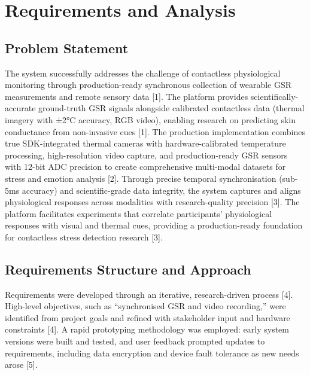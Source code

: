 
\chapter{Requirements and Analysis}
\label{ch:requirements}


\section{Problem Statement}

The system successfully addresses the challenge of contactless physiological monitoring through production-ready synchronous collection of wearable GSR measurements and remote sensory data [1]. The platform provides scientifically-accurate ground-truth GSR signals alongside calibrated contactless data (thermal imagery with ±2°C accuracy, RGB video), enabling research on predicting skin conductance from non-invasive cues [1]. The production implementation combines true SDK-integrated thermal cameras with hardware-calibrated temperature processing, high-resolution video capture, and production-ready GSR sensors with 12-bit ADC precision to create comprehensive multi-modal datasets for stress and emotion analysis [2]. Through precise temporal synchronisation (sub-5ms accuracy) and scientific-grade data integrity, the system captures and aligns physiological responses across modalities with research-quality precision [3]. The platform facilitates experiments that correlate participants' physiological responses with visual and thermal cues, providing a production-ready foundation for contactless stress detection research [3].


\section{Requirements Structure and Approach}

Requirements were developed through an iterative, research-driven process [4]. High-level objectives, such as “synchronised GSR and video recording,” were identified from project goals and refined with stakeholder input and hardware constraints [4]. A rapid prototyping methodology was employed: early system versions were built and tested, and user feedback prompted updates to requirements, including data encryption and device fault tolerance as new needs arose [5].

